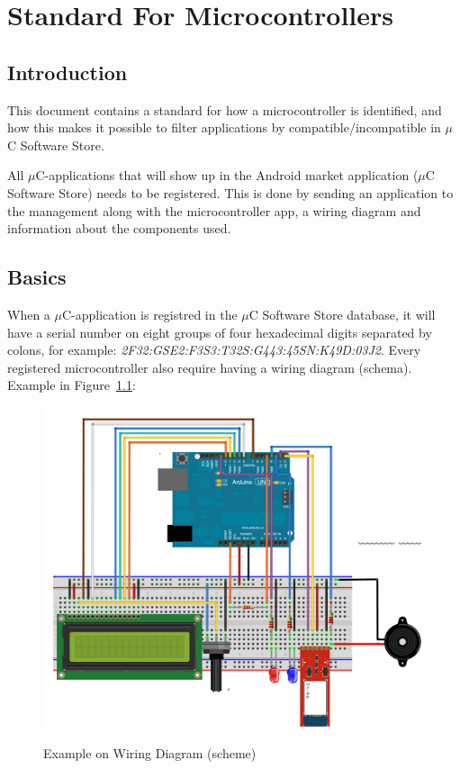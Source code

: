 \chapter{Standard For Microcontrollers}

\section{Introduction}
This document contains a standard for how a microcontroller is identified, and how this makes it possible to filter applications by compatible/incompatible in $\mu$C Software Store.

All $\mu$C-applications that will show up in the Android market application ($\mu$C Software Store) needs to be registered. This is done by sending an application to the management along with the microcontroller app, a wiring diagram and information about the components used.

\section{Basics}
When a $\mu$C-application is registred in the $\mu$C Software Store database, it will have a serial number on eight groups of four hexadecimal digits separated by colons, for example: \textit{2F32:GSE2:F3S3:T32S:G443:45SN:K49D:03J2}. Every registered microcontroller also require having a wiring diagram (schema). Example in Figure~\ref{fig:wiring_simple}:

\begin{figure}[H]
\caption{Example on Wiring Diagram (scheme)}
\centering
\includegraphics[scale=0.8]{images/wiring_diagram.png}
\label{fig:wiring_simple}
\end{figure}

